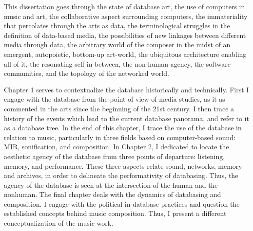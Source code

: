 







% 
% 
% 





This dissertation goes through the state of database art, the use of computers in music and art, the collaborative aspect surrounding computers, the immateriality that percolates through the arts as data, the terminological struggles in the definition of data-based media, the possibilities of new linkages between different media through data, the arbitrary world of the composer in the midst of an emergent, autopoietic, bottom-up art-world, the ubiquitous architecture enabling all of it, the resonating self in between, the non-human agency, the software communities, and the topology of the networked world.







Chapter 1 serves to contextualize the database historically and technically. First I engage with the database from the point of view of media studies, as it as commented in the arts since the beginning of the 21st century. I then trace a history of the events which lead to the current database panorama, and refer to it as a database tree. In the end of this chapter, I trace the use of the database in relation to music, particularly in three fields based on computer-based sound: MIR, sonification, and composition. In Chapter 2, I dedicated to locate the aesthetic agency of the database from three points of departure: listening, memory, and performance. These three aspects relate sound, networks, memory and archives, in order to delineate the performativity of databasing. Thus, the agency of the database is seen at the intersection of the human and the nonhuman. The final chapter deals with the dynamics of databasing and composition. I engage with the political in database practices and question the established concepts behind music composition. Thus, I present a different conceptualization of the music work.








